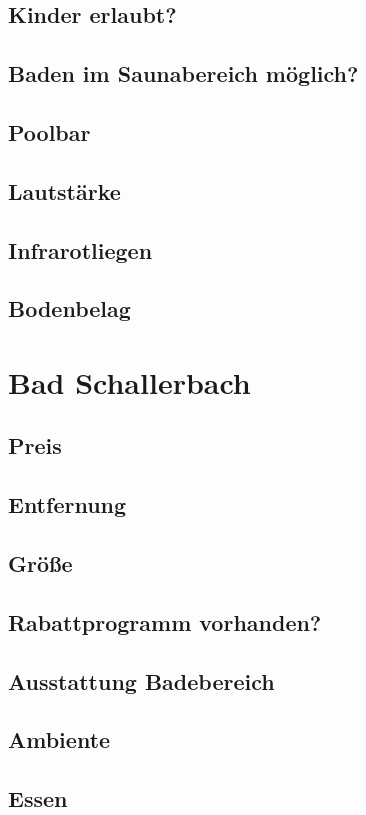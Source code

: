 \documentclass{article}
\begin{document}
\subsection*{Kinder erlaubt?}
\subsection*{Baden im Saunabereich möglich?}
\subsection*{Poolbar}
\subsection*{Lautstärke}
\subsection*{Infrarotliegen}
\subsection*{Bodenbelag}
\pagebreak

\section*{Bad Schallerbach}
\subsection*{Preis}
\subsection*{Entfernung}
\subsection*{Größe}
\subsection*{Rabattprogramm vorhanden?}
\subsection*{Ausstattung Badebereich}
\subsection*{Ambiente}
\subsection*{Essen}
\end{document}
